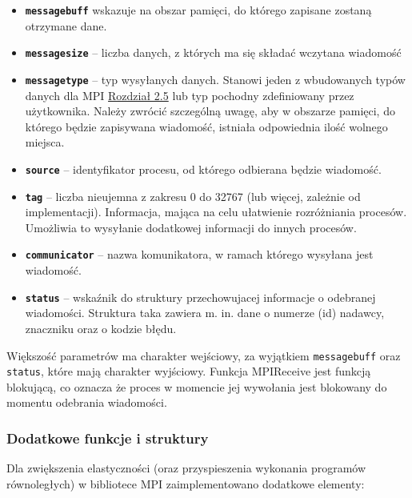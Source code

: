 \begin{itemize}
	\item \texttt{\textbf{message\textunderscore buff}} wskazuje na obszar pamięci, do którego zapisane zostaną otrzymane dane.
	\item \texttt{\textbf{message\textunderscore size}} -- liczba danych, z których ma się składać wczytana wiadomość
	\item \texttt{\textbf{message\textunderscore type}} -- typ wysyłanych danych. Stanowi jeden z wbudowanych typów danych dla MPI \hyperref[table:datatypes]{Rozdział 2.5} lub typ pochodny zdefiniowany przez użytkownika. Należy zwrócić szczególną uwagę, aby w obszarze pamięci, do którego będzie zapisywana wiadomość, istniała odpowiednia ilość wolnego miejsca.
	\item \texttt{\textbf{source}} -- identyfikator procesu, od którego odbierana będzie wiadomość.
	\item \texttt{\textbf{tag}} -- liczba nieujemna z zakresu 0 do 32767 (lub więcej, zależnie od implementacji). Informacja, mająca na celu ułatwienie rozróżniania procesów. Umożliwia to wysyłanie dodatkowej informacji do innych procesów.
	\item \texttt{\textbf{communicator}} -- nazwa komunikatora, w ramach którego wysyłana jest wiadomość.
	\item \texttt{\textbf{status}} -- wskaźnik do struktury przechowujacej informacje o odebranej wiadomości. Struktura taka zawiera m. in. dane o numerze (id) nadawcy, znaczniku oraz o kodzie błędu.
\end{itemize}

Większość parametrów ma charakter wejściowy, za wyjątkiem \texttt{message\textunderscore buff} oraz \texttt{status}, które mają charakter wyjściowy. Funkcja MPI\textunderscore Receive jest funkcją blokującą, co oznacza że proces w momencie jej wywołania jest blokowany do momentu odebrania wiadomości.

\subsubsection{Dodatkowe funkcje i struktury}

Dla zwiększenia elastyczności (oraz przyspieszenia wykonania programów równoległych) w bibliotece MPI zaimplementowano dodatkowe elementy:

